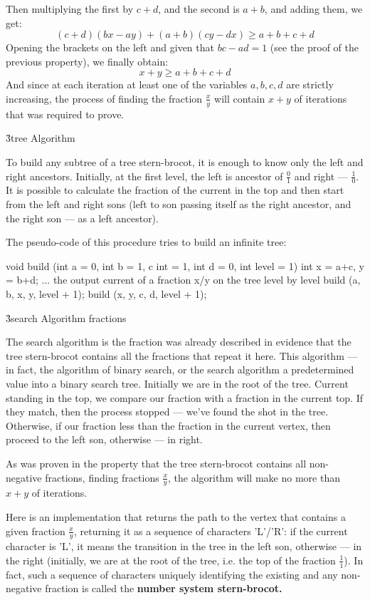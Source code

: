 Then multiplying the first by $c+d$, and the second is $a+b$, and adding them, we get:
$$ (c+d)(bx-ay) + (a+b)(cy-dx) \ge a+b+c+d $$
Opening the brackets on the left and given that $bc-ad=1$ (see the proof of the previous property), we finally obtain:
$$ x+y \ge a+b+c+d $$
And since at each iteration at least one of the variables $a, b, c, d$ are strictly increasing, the process of finding the fraction $\frac{x}{y}$ will contain $x+y$ of iterations that was required to prove.

\h3{tree Algorithm}

To build any subtree of a tree stern-brocot, it is enough to know only the left and right ancestors. Initially, at the first level, the left is ancestor of $\frac{0}{1}$ and right --- $\frac{1}{0}$. It is possible to calculate the fraction of the current in the top and then start from the left and right sons (left to son passing itself as the right ancestor, and the right son --- as a left ancestor).

The pseudo-code of this procedure tries to build an infinite tree:

\code
void build (int a = 0, int b = 1, c int = 1, int d = 0, int level = 1) {
int x = a+c, y = b+d;
... the output current of a fraction x/y on the tree level by level
build (a, b, x, y, level + 1);
build (x, y, c, d, level + 1);
}
\endcode

\h3{search Algorithm fractions}

The search algorithm is the fraction was already described in evidence that the tree stern-brocot contains all the fractions that repeat it here. This algorithm --- in fact, the algorithm of binary search, or the search algorithm a predetermined value into a binary search tree. Initially we are in the root of the tree. Current standing in the top, we compare our fraction with a fraction in the current top. If they match, then the process stopped --- we've found the shot in the tree. Otherwise, if our fraction less than the fraction in the current vertex, then proceed to the left son, otherwise --- in right.

As was proven in the property that the tree stern-brocot contains all non-negative fractions, finding fractions $\frac{x}{y}$, the algorithm will make no more than $x+y$ of iterations.

Here is an implementation that returns the path to the vertex that contains a given fraction $\frac{x}{y}$, returning it as a sequence of characters 'L'/'R': if the current character is 'L', it means the transition in the tree in the left son, otherwise --- in the right (initially, we are at the root of the tree, i.e. the top of the fraction $\frac{1}{1}$). In fact, such a sequence of characters uniquely identifying the existing and any non-negative fraction is called the \bf{number system stern-brocot}.

